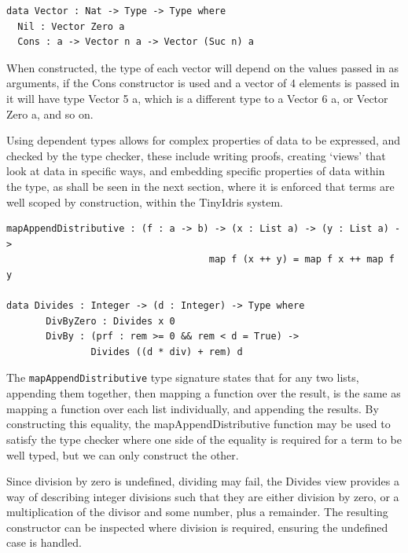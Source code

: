 \documentclass[a4paper]{article}
\begin{document}
\begin{center}
\begin{verbatim}
data Vector : Nat -> Type -> Type where
  Nil : Vector Zero a
  Cons : a -> Vector n a -> Vector (Suc n) a
\end{verbatim}
\end{center}

When constructed, the type of each vector will depend on the values 
passed in as arguments, if the Cons constructor is used and a vector of 
4 elements is passed in it will have type Vector 5 a, which is a 
different type to a Vector 6 a, or Vector Zero a, and so on. 

Using dependent types allows for complex properties of data to be 
expressed, and checked by the type checker, these include writing
proofs, creating `views' that look at data in specific ways,
and embedding specific properties of data within the type, as shall be 
seen in the next section, where it is enforced that terms are well 
scoped by construction, within the TinyIdris system. 

\begin{center}
\begin{verbatim}
mapAppendDistributive : (f : a -> b) -> (x : List a) -> (y : List a) ->
						            map f (x ++ y) = map f x ++ map f y

data Divides : Integer -> (d : Integer) -> Type where
	   DivByZero : Divides x 0
	   DivBy : (prf : rem >= 0 && rem < d = True) ->
			   Divides ((d * div) + rem) d
\end{verbatim}
\end{center}

The \texttt{mapAppendDistributive} type signature states that for any
two lists, appending them together, then mapping a function over the
result, is the same as mapping a function over each list individually,
and appending the results. By constructing this equality, the
mapAppendDistributive function may be used to satisfy the type checker
where one side of the equality is required for a term to be well typed,
but we can only construct the other.

Since division by zero is undefined, dividing may fail, the Divides
view provides a way of describing integer divisions such that they
are either division by zero, or a multiplication of the divisor and some
number, plus a remainder. The resulting constructor can be inspected
where division is required, ensuring the undefined case is handled. 
\end{document}
